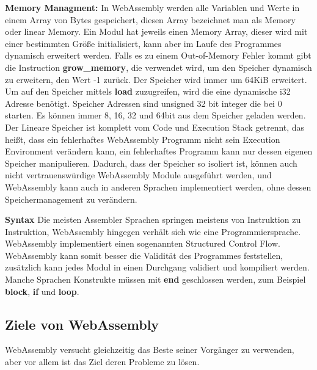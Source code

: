 \begin{flushleft}
\hfill \break

\textbf{Memory Managment:} In WebAssembly werden alle Variablen und Werte in einem Array von Bytes gespeichert, diesen Array bezeichnet man als Memory oder linear Memory. Ein Modul hat jeweils einen Memory Array, dieser wird mit einer bestimmten Größe initialisiert, kann aber im Laufe des Programmes dynamisch erweitert werden. Falls es zu einem Out-of-Memory Fehler kommt gibt die Instruction \textbf{grow\_memory}, die verwendet wird, um den Speicher dynamisch zu erweitern, den Wert -1 zurück. Der Speicher wird immer um 64KiB erweitert. 
Um auf den Speicher mittels \textbf{load} zuzugreifen, wird die eine dynamische i32 Adresse benötigt. Speicher Adressen sind unsigned 32 bit integer die bei 0 starten. Es können immer 8, 16, 32 und 64bit aus dem Speicher geladen werden.
Der Lineare Speicher ist komplett vom Code und Execution Stack getrennt, das heißt, dass ein fehlerhaftes WebAssembly Programm nicht sein Execution Environment verändern kann, ein fehlerhaftes Programm kann nur dessen eigenen Speicher manipulieren. Dadurch, dass der Speicher so isoliert ist, können auch nicht vertrauenswürdige WebAssembly Module ausgeführt werden, und WebAssembly kann auch in anderen Sprachen implementiert werden, ohne dessen Speichermanagement zu verändern. \autocite[]{Haas2017} \autocite[]{Ansel2011} \break

\textbf{Syntax} Die meisten Assembler Sprachen springen meistens von Instruktion zu Instruktion, WebAssembly hingegen verhält sich wie eine Programmiersprache. WebAssembly implementiert einen sogenannten Structured Control Flow. WebAssembly kann somit besser die Validität des Programmes feststellen, zusätzlich kann jedes Modul in einen Durchgang validiert und kompiliert werden.
Manche Sprachen Konstrukte müssen mit \textbf{end} geschlossen werden, zum Beispiel \textbf{block}, \textbf{if} und \textbf{loop}. \autocite[]{Haas2017}

\end{flushleft}

\subsection{Ziele von WebAssembly}

WebAssembly versucht gleichzeitig das Beste seiner Vorgänger zu verwenden, aber vor allem ist das Ziel deren Probleme zu lösen.

